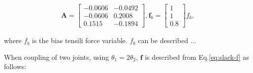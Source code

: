 \documentclass{llncs}
\begin{document}


 			\begin{align}
				\bm{A} = \begin{bmatrix}
					-0.0606 & -0.0492	\\
					-0.0606 & 0.2008	\\
					0.1515 & -0.1894
				\end{bmatrix},	
				\bm{f}_b = \begin{bmatrix}
					1 \\
					1 \\
					0.8
				\end{bmatrix}f_b, 
			\end{align}

	where $f_b$ is the bias tensili force variable.
	$f_b$ can be described ...

	When coupling of two joints, using $\theta_1=2\theta_2$, $\bm{f}$ is described from Eq.\ref{eq:slack-f} as follows:

\end{document}
